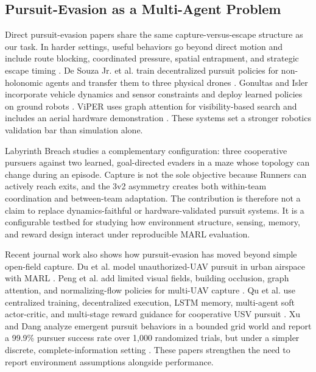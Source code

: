 \documentclass[journal]{IEEEtran}
\begin{document}
\subsection{Pursuit-Evasion as a Multi-Agent Problem}

Direct pursuit-evasion papers share the same capture-versus-escape structure as our task. In harder settings, useful behaviors go beyond direct motion and include route blocking, coordinated pressure, spatial entrapment, and strategic escape timing \cite{verma2019mapel,viper2025,gonultas2024,yan2019uncertain,liu2024uav,haeri2022emergent}. De Souza Jr. et al. train decentralized pursuit policies for non-holonomic agents and transfer them to three physical drones \cite{desouza2020}. Gonultas and Isler incorporate vehicle dynamics and sensor constraints and deploy learned policies on ground robots \cite{gonultas2024}. ViPER uses graph attention for visibility-based search and includes an aerial hardware demonstration \cite{viper2025}. These systems set a stronger robotics validation bar than simulation alone.

Labyrinth Breach studies a complementary configuration: three cooperative pursuers against two learned, goal-directed evaders in a maze whose topology can change during an episode. Capture is not the sole objective because Runners can actively reach exits, and the 3v2 asymmetry creates both within-team coordination and between-team adaptation. The contribution is therefore not a claim to replace dynamics-faithful or hardware-validated pursuit systems. It is a configurable testbed for studying how environment structure, sensing, memory, and reward design interact under reproducible MARL evaluation.

Recent journal work also shows how pursuit-evasion has moved beyond simple open-field capture. Du et al. model unauthorized-UAV pursuit in urban airspace with MARL \cite{du2021uav}. Peng et al. add limited visual fields, building occlusion, graph attention, and normalizing-flow policies for multi-UAV capture \cite{peng2025limited}. Qu et al. use centralized training, decentralized execution, LSTM memory, multi-agent soft actor-critic, and multi-stage reward guidance for cooperative USV pursuit \cite{qu2026usv}. Xu and Dang analyze emergent pursuit behaviors in a bounded grid world and report a 99.9\% pursuer success rate over 1,000 randomized trials, but under a simpler discrete, complete-information setting \cite{xu2025emergent}. These papers strengthen the need to report environment assumptions alongside performance.
\end{document}
